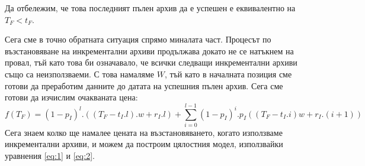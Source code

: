\documentclass[11pt, a4paper]{article}
\theoremstyle{definition}
\begin{document}
			Да отбележим, че това последният пълен архив да е успешен е еквивалентно на $T_F<t_F$.\par
			Сега сме в точно обратната ситуация спрямо миналата част. Процесът по възстановяване на инкрементални архиви продължава докато не се натъкнем на провал, тъй като това би означавало, че всички следващи инкрементални архиви също са неизползваеми. С това намаляме $W$, тъй като в началната позиция сме готови да преработим данните до датата на успешния пълен архив. Сега сме готови да изчислим очакваната цена:
			\begin{equation}
				\label{eq:2}
				f(T_F) = (1-p_I)^l.((T_F-t_I.l).w + r_I.l) + \displaystyle \sum_{i=0}^{l-1} (1-p_I)^{i}.p_I((T_F-t_I.i)w + r_I.(i+1))
			\end{equation}
			Сега знаем колко ще намалее цената на възстановяването, когато използваме инкрементални архиви, и можем да построим цялостния модел, използвайки уравнения \ref{eq:1} и \ref{eq:2}.
\end{document}
